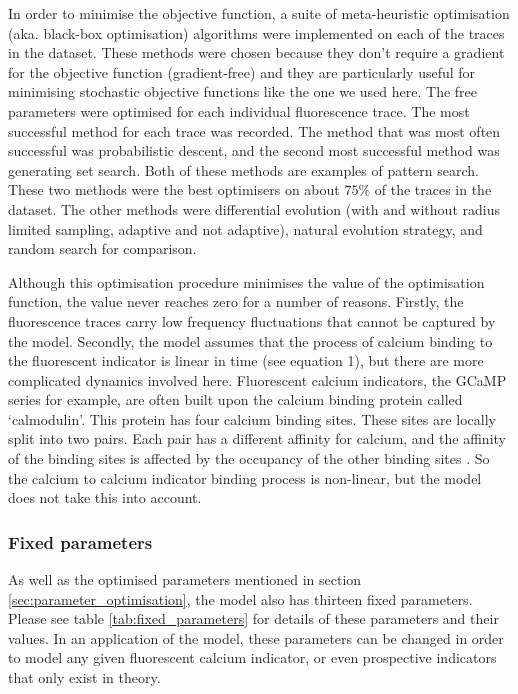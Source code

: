 In order to minimise the objective function, a suite of meta-heuristic optimisation (aka. black-box optimisation) algorithms were implemented on each of the traces in the dataset. These methods were chosen because they don’t require a gradient for the objective function (gradient-free) and they are particularly useful for minimising stochastic objective functions like the one we used here. The free parameters were optimised for each individual fluorescence trace. The most successful method for each trace was recorded. The method that was most often successful was probabilistic descent, and the second most successful method was generating set search. Both of these methods are examples of pattern search. These two methods were the best optimisers on about $75\%$ of the traces in the dataset. The other methods were differential evolution (with and without radius limited sampling, adaptive and not adaptive), natural evolution strategy, and random search for comparison.

Although this optimisation procedure minimises the value of the optimisation function, the value never reaches zero for a number of reasons. Firstly, the fluorescence traces carry low frequency fluctuations that cannot be captured by the model. Secondly, the model assumes that the process of calcium binding to the fluorescent indicator is linear in time (see equation 1), but there are more complicated dynamics involved here. Fluorescent calcium indicators, the GCaMP series for example, are often built upon the calcium binding protein called `calmodulin'. This protein has four calcium binding sites. These sites are locally split into two pairs. Each pair has a different affinity for calcium, and the affinity of the binding sites is affected by the occupancy of the other binding sites  \parencite{kilhoffer}. So the calcium to calcium indicator binding process is non-linear, but the model does not take this into account.

\subsubsection{Fixed parameters}
As well as the optimised parameters mentioned in section \ref{sec:parameter_optimisation}, the model also has thirteen fixed parameters. Please see table \ref{tab:fixed_parameters} for details of these parameters and their values. In an application of the model, these parameters can be changed in order to model any given fluorescent calcium indicator, or even prospective indicators that only exist in theory.

